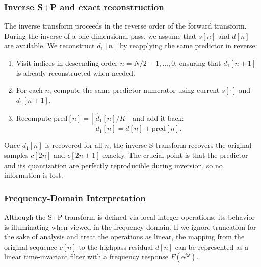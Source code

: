\subsubsection{Inverse S+P and exact reconstruction}

The inverse transform proceeds in the reverse order of the forward transform. During the inverse of a one-dimensional pass, we assume that $s[n]$ and $d[n]$ are available. We reconstruct $d_1[n]$ by reapplying the same predictor in reverse:
\begin{enumerate}
    \item Visit indices in descending order $n = N/2-1, \dots, 0$, ensuring that $d_1[n+1]$ is already reconstructed when needed.
    \item For each $n$, compute the same predictor numerator using current $s[\cdot]$ and $d_1[n+1]$.
    \item Recompute $\mathrm{pred}[n] = \left\lfloor \hat{d}_1[n] / K \right\rfloor$ and add it back:
    \begin{equation}
        d_1[n] = d[n] + \mathrm{pred}[n].
    \end{equation}
\end{enumerate}
Once $d_1[n]$ is recovered for all $n$, the inverse S transform recovers the original samples $c[2n]$ and $c[2n+1]$ exactly. The crucial point is that the predictor and its quantization are perfectly reproducible during inversion, so no information is lost.

\subsubsection{Frequency-Domain Interpretation}

Although the S+P transform is defined via local integer operations, its behavior is illuminating when viewed in the frequency domain. If we ignore truncation for the sake of analysis and treat the operations as linear, the mapping from the original sequence $c[n]$ to the highpass residual $d[n]$ can be represented as a linear time-invariant filter with a frequency response $F(\mathrm{e}^{j\omega})$.

